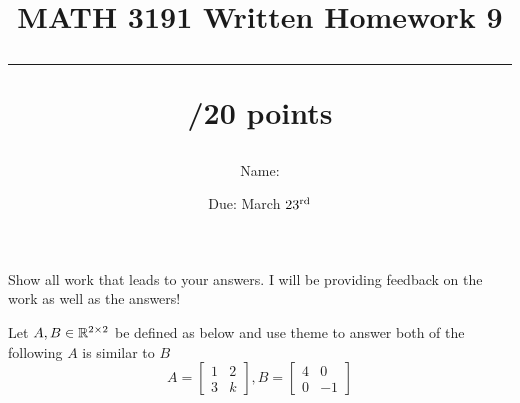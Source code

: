 \documentclass{exam}
\title{MATH 3191 Written Homework 9\\\rule{30pt}{1pt}/20 points}
\author{Name: \rule{150pt}{1pt}}
\date{Due: March $23^\textnormal{rd}$}
\newcommand{\bMat}[1]{\begin{bmatrix}#1\end{bmatrix}}
\begin{document}
\maketitle
Show all work that leads to your answers. I will be providing feedback on the work as well as the answers!
\begin{questions}
    \question Let $A,B\in\mathbb{R}^{2\times 2}$ be defined as below and use theme to answer both of the following
    $A$ is similar to $B$
    \[
        A = \bMat{
            1 & 2\\
            3 & k
        }, B = \bMat{
            4 & 0 \\
            0 & -1
        }
    \]
\end{questions}
\end{document}
